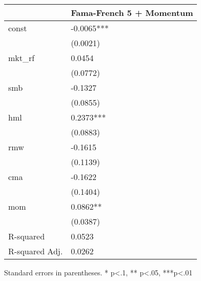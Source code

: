 \begin{table}
\caption{}
\label{}
\begin{center}
\begin{tabular}{ll}
\hline
               & Fama-French 5 + Momentum  \\
\hline
const          & -0.0065***                \\
               & (0.0021)                  \\
mkt\_rf        & 0.0454                    \\
               & (0.0772)                  \\
smb            & -0.1327                   \\
               & (0.0855)                  \\
hml            & 0.2373***                 \\
               & (0.0883)                  \\
rmw            & -0.1615                   \\
               & (0.1139)                  \\
cma            & -0.1622                   \\
               & (0.1404)                  \\
mom            & 0.0862**                  \\
               & (0.0387)                  \\
R-squared      & 0.0523                    \\
R-squared Adj. & 0.0262                    \\
\hline
\end{tabular}
\end{center}
\end{table}
\bigskip
Standard errors in parentheses. \newline 
* p<.1, ** p<.05, ***p<.01